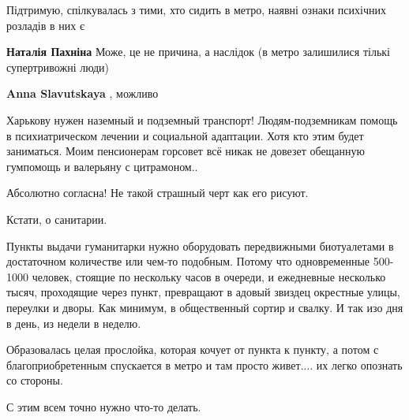 \begin{itemize}
\begin{itemize}
\end{itemize} %

Підтримую, спілкувалась з тими, хто сидить в метро, наявні ознаки психічних розладів в них є

\textbf{Наталія Пахніна} Може, це не причина, а наслідок (в метро залишилися тількі супертривожні люди)

\textbf{Anna Slavutskaya} , можливо


Харькову нужен наземный и подземный транспорт! Людям-подземникам помощь в
психиатрическом лечении и социальной адаптации. Хотя кто этим будет заниматься.
Моим пенсионерам горсовет всё никак не довезет обещанную гумпомощь и валерьяну
с цитрамоном..

Абсолютно согласна! Не такой страшный черт как его рисуют.


Кстати, о санитарии.

Пункты выдачи гуманитарки нужно оборудовать передвижными биотуалетами в
достаточном количестве или чем-то подобным. Потому что одновременные 500-1000
человек, стоящие по нескольку часов в очереди, и ежедневные несколько тысяч,
проходящие через пункт, превращают в адовый звиздец окрестные улицы, переулки и
дворы. Как минимум, в общественный сортир и свалку. И так изо дня в день, из
недели в неделю.

Образовалась целая прослойка, которая кочует от пункта к пункту, а потом с
благоприобретенным спускается в метро и там просто живет.... их легко опознать
со стороны.

С этим всем точно нужно что-то делать.


\end{itemize} %
